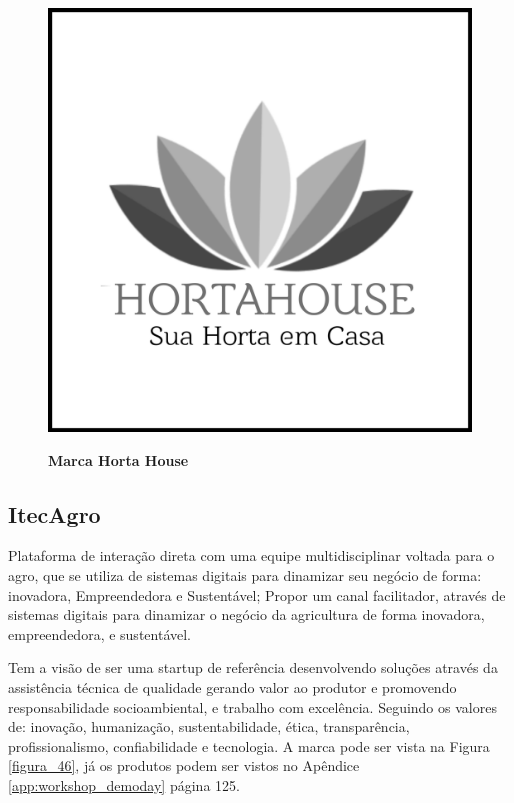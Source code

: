 \begin{figure}[H]
\centering
\caption{\textbf{Marca Horta House}}
\includegraphics[scale=0.08]{Imagens/hortahouse.png}
\label{figura_25}
\end{figure}



\subsection{ItecAgro}

Plataforma de interação direta com uma equipe multidisciplinar voltada para o agro, que se utiliza de sistemas digitais para dinamizar seu negócio de forma: inovadora, Empreendedora e Sustentável; Propor um canal facilitador, através de sistemas digitais para dinamizar o negócio da agricultura de forma inovadora, empreendedora, e sustentável.

Tem a visão de ser uma startup de referência desenvolvendo soluções através da assistência técnica de qualidade gerando valor ao produtor e promovendo responsabilidade socioambiental, e trabalho com excelência.
Seguindo os valores de: inovação, humanização, sustentabilidade, ética, transparência, profissionalismo, confiabilidade e tecnologia. A marca pode ser vista na Figura \ref{figura_46}, já os produtos podem ser vistos no Apêndice \ref{app:workshop_demoday} página 125.

